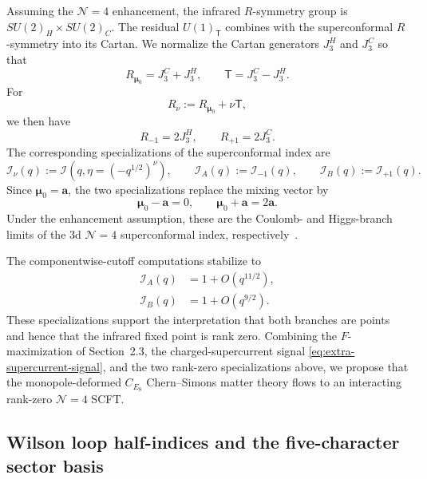 \documentclass[11pt,a4paper]{article}
\numberwithin{equation}{section}
\begin{document}
Assuming the $\mathcal N=4$ enhancement, the infrared $R$-symmetry group is $SU(2)_H\times SU(2)_C$.  The residual $U(1)_{\mathsf T}$ combines with the superconformal $R$-symmetry into its Cartan.  We normalize the Cartan generators $J_3^H$ and $J_3^C$ so that
\begin{equation}
  R_{\boldsymbol\mu_0}=J_3^C+J_3^H,
  \qquad
  \mathsf T=J_3^C-J_3^H.
  \label{eq:N4-R-decomposition}
\end{equation}
For
\begin{equation}
  R_\nu:=R_{\boldsymbol\mu_0}+\nu\mathsf T,
\end{equation}
we then have
\begin{equation}
  R_{-1}=2J_3^H,
  \qquad
  R_{+1}=2J_3^C.
  \label{eq:AB-R-symmetries}
\end{equation}
The corresponding specializations of the superconformal index are
\begin{equation}
  \mathcal I_\nu(q)
  :=\mathcal I\!\left(q,\eta=\left(-q^{1/2}\right)^\nu\right),
  \qquad
  \mathcal I_A(q):=\mathcal I_{-1}(q),
  \qquad
  \mathcal I_B(q):=\mathcal I_{+1}(q).
  \label{eq:AB-index-specializations}
\end{equation}
Since $\boldsymbol\mu_0=\boldsymbol a$, the two specializations replace the mixing vector by
\begin{equation}
  \boldsymbol\mu_0-\boldsymbol a=0,
  \qquad
  \boldsymbol\mu_0+\boldsymbol a=2\boldsymbol a.
  \label{eq:AB-effective-mixings}
\end{equation}
Under the enhancement assumption, these are the Coulomb- and Higgs-branch limits of the 3d $\mathcal N=4$ superconformal index, respectively~\cite{Closset:2016arn,Razamat:2014pta}.

The componentwise-cutoff computations stabilize to
\begin{align}
  \mathcal I_A(q)&=1+O(q^{11/2}),
  \label{eq:A-index-rank-zero}\\
  \mathcal I_B(q)&=1+O(q^{9/2}).
  \label{eq:B-index-rank-zero}
\end{align}
These specializations support the interpretation that both branches are points and hence that the infrared fixed point is rank zero.  Combining the $F$-maximization of Section~2.3, the charged-supercurrent signal \eqref{eq:extra-supercurrent-signal}, and the two rank-zero specializations above, we propose that the monopole-deformed $C_{E_8}$ Chern--Simons matter theory flows to an interacting rank-zero $\mathcal N=4$ SCFT.


\subsection{Wilson loop half-indices and the five-character sector basis}
\label{subsec:Wilson-half-indices}
\end{document}
